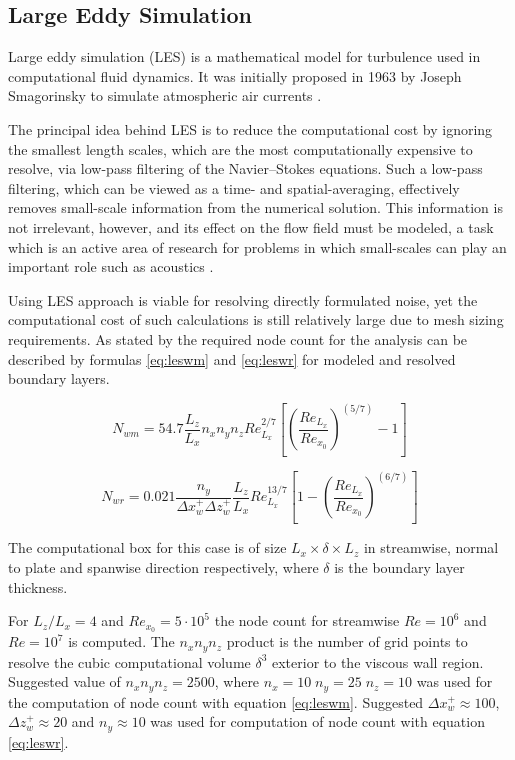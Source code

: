 \subsection{Large Eddy Simulation} \label{LES}
Large eddy simulation (LES) is a mathematical model for turbulence used in computational fluid dynamics. It was initially proposed in 1963 by Joseph Smagorinsky to simulate atmospheric air currents \citep{LES1}.

The principal idea behind LES is to reduce the computational cost by ignoring the smallest length scales, which are the most computationally expensive to resolve, via low-pass filtering of the Navier–Stokes equations. Such a low-pass filtering, which can be viewed as a time- and spatial-averaging, effectively removes small-scale information from the numerical solution. This information is not irrelevant, however, and its effect on the flow field must be modeled, a task which is an active area of research for problems in which small-scales can play an important role such as acoustics \citep{LES2}.

Using LES approach is viable for resolving directly formulated noise, yet the computational cost of such calculations is still relatively large due to mesh sizing requirements. As stated by \citep{LES_size} the required node count for the analysis can be described by formulas \ref{eq:leswm} and \ref{eq:leswr} for modeled and resolved boundary layers.

\begin{equation} \label{eq:leswm}
N_{wm} = 54.7 \frac{L_z}{L_x} n_x n_y n_z Re^{2/7}_{L_x} \left[ \left( \frac{Re_{L_x}}{Re_{x_0}} \right)^{(5/7)} - 1\right]
\end{equation}

\begin{equation} \label{eq:leswr}
N_{wr} = 0.021 \frac{n_y}{\Delta x_w^{+} \Delta z_w^{+}} \frac{L_z}{L_x} Re^{13/7}_{L_x} \left[ 1 - \left( \frac{Re_{L_x}}{Re_{x_0}} \right)^{(6/7)} \right]
\end{equation}

The computational box for this case is of size $L_x \times \delta \times L_z$ in streamwise, normal to plate and spanwise direction respectively, where $\delta$ is the boundary layer thickness.

For $L_z / L_x = 4$ and $Re_{x_0} = 5 \cdot 10^5$ the node count for streamwise $Re = 10^6$ and $Re = 10^7$ is computed. The $n_x n_y n_z$ product is the number of grid points to resolve the cubic computational volume $\delta^3$ exterior to the viscous wall region. Suggested value of $n_x n_y n_z = 2500$, where $n_x = 10 \; n_y = 25 \; n_z = 10$ was used for the computation of node count with equation \ref{eq:leswm}. Suggested $\Delta x_w^{+} \approx 100$, $\Delta z_w^{+} \approx 20$ and $n_y \approx 10$ was used for computation of node count with equation \ref{eq:leswr}.

